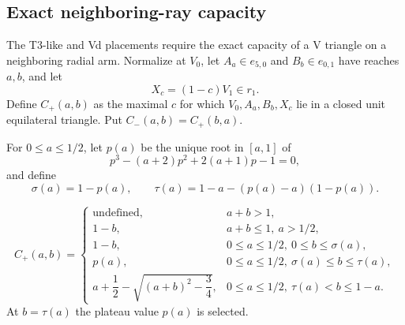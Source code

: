 \subsection{Exact neighboring-ray capacity}
\label{subsec:new-neighbor-ray-capacity}

The T3-like and Vd placements require the exact capacity of a V triangle on a
neighboring radial arm.  Normalize at $V_0$, let $A_a\in e_{5,0}$ and
$B_b\in e_{0,1}$ have reaches $a,b$, and let
\[
 X_c=(1-c)V_1\in r_1.
\]
Define $C_+(a,b)$ as the maximal $c$ for which
$V_0,A_a,B_b,X_c$ lie in a closed unit equilateral triangle.  Put
$C_-(a,b)=C_+(b,a)$.

For $0\le a\le1/2$, let $p(a)$ be the unique root in $[a,1]$ of
\[
 p^3-(a+2)p^2+2(a+1)p-1=0,
 \tag{6.24a}
\]
and define
\[
 \sigma(a)=1-p(a),
 \qquad
 \tau(a)=1-a-(p(a)-a)(1-p(a)).
\]

\begin{proposition}
\label{prop:new-neighbor-ray-formula}
\[
C_+(a,b)=
\begin{cases}
\text{undefined},&a+b>1,\\
1-b,&a+b\le1,\ a>1/2,\\
1-b,&0\le a\le1/2,\ 0\le b\le\sigma(a),\\
p(a),&0\le a\le1/2,\ \sigma(a)\le b\le\tau(a),\\
a+\dfrac12-\sqrt{(a+b)^2-\dfrac34},
 &0\le a\le1/2,\ \tau(a)<b\le1-a.
\end{cases}
\tag{6.24b}
\]
At $b=\tau(a)$ the plateau value $p(a)$ is selected.
\end{proposition}



